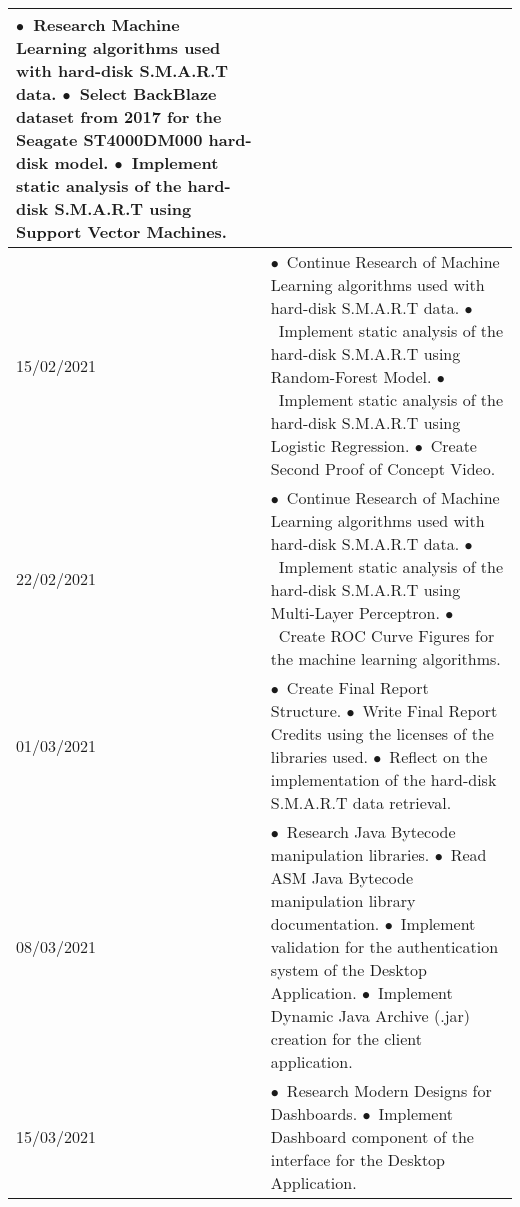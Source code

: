 \begin{longtable}{
|p{}%
|p{}|%
}
    \indent$\bullet$\ Research Machine Learning algorithms used with hard-disk S.M.A.R.T data. \newline
    \indent$\bullet$\ Select BackBlaze dataset from 2017 for the Seagate ST4000DM000 hard-disk model. \newline
    \indent$\bullet$\ Implement static analysis of the hard-disk S.M.A.R.T using Support Vector Machines.
    \\ \hline
    15/02/2021                 &
    \indent$\bullet$\ Continue Research of Machine Learning algorithms used with hard-disk S.M.A.R.T data. \newline
    \indent$\bullet$\ Implement static analysis of the hard-disk S.M.A.R.T using Random-Forest Model.
    \indent$\bullet$\ Implement static analysis of the hard-disk S.M.A.R.T using Logistic Regression.
    \indent$\bullet$\ Create Second Proof of Concept Video.
    \\ \hline
    22/02/2021                 &
    \indent$\bullet$\ Continue Research of Machine Learning algorithms used with hard-disk S.M.A.R.T data. \newline
    \indent$\bullet$\ Implement static analysis of the hard-disk S.M.A.R.T using Multi-Layer Perceptron. \newline
    \indent$\bullet$\ Create ROC Curve Figures for the machine learning algorithms.
    \\ \hline
    01/03/2021                 &
    \indent$\bullet$\ Create Final Report Structure. \newline
    \indent$\bullet$\ Write Final Report Credits using the licenses of the libraries used. \newline
    \indent$\bullet$\ Reflect on the implementation of the hard-disk S.M.A.R.T data retrieval.
    \\ \hline
    08/03/2021                 &
    \indent$\bullet$\ Research Java Bytecode manipulation libraries. \newline
    \indent$\bullet$\ Read ASM Java Bytecode manipulation library documentation. \newline
    \indent$\bullet$\ Implement validation for the authentication system of the Desktop Application. \newline
    \indent$\bullet$\ Implement Dynamic Java Archive (.jar) creation for the client application.
    \\ \hline
    15/03/2021                 &
    \indent$\bullet$\ Research Modern Designs for Dashboards. \newline
    \indent$\bullet$\ Implement Dashboard component of the interface for the Desktop Application. \newline

\end{longtable}

